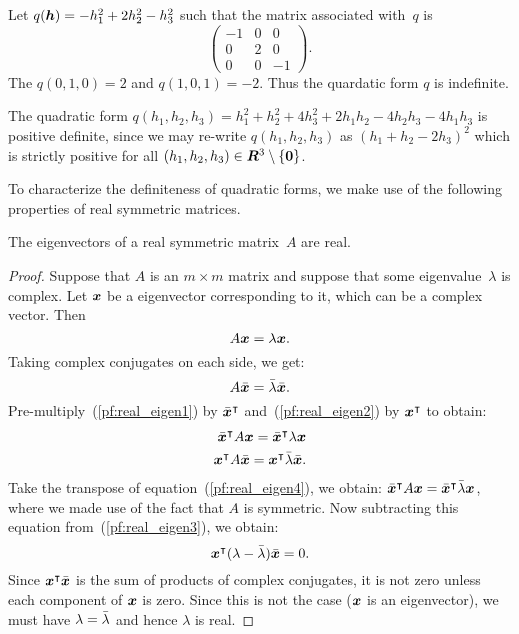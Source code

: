 \begin{example}
Let $q(\boldsymbol{h}) = -h_1^2 + 2h_2^2 - h_3^2$ such that the matrix associated with~$q$ is
\[
	\begin{pmatrix}
	-1 & 0 & 0 \\
	0  & 2 & 0 \\
    0  & 0 & -1 
	\end{pmatrix}.
\]
The $q(0, 1, 0) = 2$ and $q(1, 0, 1) = -2$. Thus the quardatic form $q$ is indefinite.
\end{example}    

\begin{example}
The quadratic form $q(h_1, h_2, h_3) = h_1^2 + h_2^2 + 4h_3^2 + 2h_1h_2 - 4h_2h_3 - 4h_1 h_3$
is positive definite, since we may re-write $q(h_1, h_2, h_3)$ as $(h_1 + h_2 - 2h_3)^2$
which is strictly positive for all $(h_1, h_2, h_3) \in \bm{R}^3 \setminus \{\boldsymbol{0}\}$.
\end{example}
To characterize the definiteness of quadratic forms, we make use of the following 
properties of real symmetric matrices.
\begin{lemma}
The eigenvectors of a real symmetric matrix~$A$ are real.
\end{lemma}
\begin{proof}
Suppose that $A$ is an $m \times m$ matrix and suppose that some eigenvalue~$\lambda$ 
is complex. Let $\boldsymbol{x}$ be a eigenvector corresponding to it, which can be a complex 
vector. Then 
\begin{equation}\label{pf:real_eigen1}
	A \boldsymbol{x} =  \lambda \boldsymbol{x}.
\end{equation}
Taking complex conjugates on each side, we get:
\begin{equation}\label{pf:real_eigen2}
	A \bar{\boldsymbol{x}} =  \bar{\lambda} \bar{\boldsymbol{x}}.
\end{equation}
Pre-multiply~(\ref{pf:real_eigen1})  by $\bar{\boldsymbol{x}}^{\intercal}$ 
and~(\ref{pf:real_eigen2}) by $\boldsymbol{x}^{\intercal}$ 
to obtain:
\begin{eqnarray}
	\bar{\boldsymbol{x}}^{\intercal} A \boldsymbol{x} =  \bar{\boldsymbol{x}}^{\intercal} \lambda \boldsymbol{x} \label{pf:real_eigen3}\\
	\boldsymbol{x} ^{\intercal}A \bar{\boldsymbol{x}} =  \boldsymbol{x}^{\intercal} \bar{\lambda} \bar{\boldsymbol{x}} \label{pf:real_eigen4}.
\end{eqnarray}
Take the transpose of equation~(\ref{pf:real_eigen4}), we obtain: 
$\bar{\boldsymbol{x}}^{\intercal} A \boldsymbol{x} =  \bar{\boldsymbol{x}}^{\intercal} \bar{\lambda} \boldsymbol{x}$, 
where we made use of the fact that $A$ is symmetric. Now subtracting this equation from~(\ref{pf:real_eigen3}),
we obtain: 
\[
\boldsymbol{x}^{\intercal} (\lambda - \bar{\lambda}) \bar{\boldsymbol{x}} = 0.
\]
Since $\boldsymbol{x}^{\intercal} \bar{\boldsymbol{x}}$ is the sum of products of complex conjugates, 
it is not zero unless each component of $\boldsymbol{x}$ is zero. Since this is not the case 
($\boldsymbol{x}$ is an eigenvector), we must have $\lambda = \bar{\lambda}$ and hence $\lambda$
is real. 
\end{proof} 

